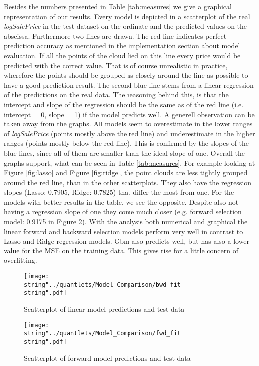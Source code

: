 Besides the numbers presented in Table \ref{tab:measures} we give a graphical representation of our results. Every model is depicted in a scatterplot of the real \textit{logSalePrice} in the test dataset on the ordinate and the predicted values on the abscissa. Furthermore two lines are drawn. The red line indicates perfect prediction accuracy as mentioned in the implementation section about model evaluation. If all the points of the cloud lied on this line every price would be predicted with the correct value. That is of course unrealistic in practice, wherefore the points should be grouped as closely around the line as possible to have a good prediction result. The second blue line stems from a linear regression of the predictions on the real data. The reasoning behind this, is that the intercept and slope of the regression should be the same as of the red line (i.e. intercept = 0, slope = 1) if the model predicts well. A generell observation can be taken away from the graphs. All models seem to overestimate in the lower ranges of \textit{logSalePrice} (points mostly above the red line) and underestimate in the higher ranges (points mostly below the red line). This is confirmed by the slopes of the blue lines, since all of them are smaller than the ideal slope of one. Overall the graphs support, what can be seen in Table \ref{tab:measures}. For example looking at Figure \ref{fig:lasso} and Figure \ref{fig:ridge}, the point clouds are less tightly grouped around the red line, than in the other scatterplots. They also have the regression slopes (Lasso: 0.7905, Ridge: 0.7825) that differ the most from one. For the models with better results in the table, we see the opposite. Despite also not having a regression slope of one they come much closer (e.g. forward selection model: 0.9175 in Figure \ref{fig:fwd}). With the analysis both numerical and graphical the linear forward and backward selection models perform very well in contrast to Lasso and Ridge regression models. Gbm also predicts well, but has also a lower value for the MSE on the training data. This gives rise for a little concern of overfitting.    




\begin{figure}[H]
\centering
	\texttt{[image: \\string"../quantlets/Model\_Comparison/bwd\_fit\\string".pdf]}
  	\caption{Scatterplot of linear model predictions and test data}
  	\label{fig:lm}
\end{figure}

\begin{figure}[H]
\centering
	\texttt{[image: \\string"../quantlets/Model\_Comparison/fwd\_fit\\string".pdf]}
  	\caption{Scatterplot of forward model predictions and test data}
  	\label{fig:fwd}
\end{figure}

